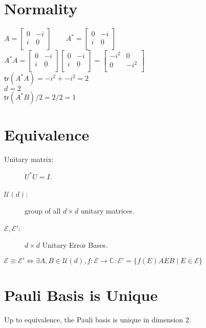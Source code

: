 \documentclass{iansnotes}
\begin{document}
\section{Normality}
$A = \begin{bmatrix}
  0 & -i \\
  i & 0 \\
\end{bmatrix} \qquad
A^* = \begin{bmatrix}
  0 & -i \\
  i &  0 \\
\end{bmatrix}$ \\[4mm]
\noindent$A^* A = \begin{bmatrix}
  0 & -i \\
  i & 0 \\
\end{bmatrix}\begin{bmatrix}
  0 & -i \\
  i & 0 \\
\end{bmatrix}=\begin{bmatrix}
  -i^2 &  0   \\
  0    & -i^2 \\
\end{bmatrix}$ \\[4mm]
$\textsf{tr}(A^*A) = -i^2 + -i^2 = 2$ \\[2mm]
$d = 2$ \\[2mm]
$\textsf{tr}(A^*B)/2 = 2/2 = 1$

\section{Equivalence}

\begin{description}
  \item[Unitary matrix:] $U^* U = I$.
  \item[$\mathcal{U}(d)$:] group of all $d \times d$ unitary matrices.
  \item[$\mathcal{E}, \mathcal{E}'$:] $d \times d$ Unitary Error Bases.
\end{description}

$\mathcal{E} \equiv \mathcal{E}' \Leftrightarrow \exists A, B \in \mathcal{U}(d), f:\mathcal{E} \rightarrow \mathbb{C} : \mathcal{E}' = \{f(E)AEB \mid E \in \mathcal{E}\}$


\section{Pauli Basis is Unique}
\begin{lemma}
  Up to equivalence, the Pauli basis is unique in dimension 2.
\end{lemma}
\end{document}

